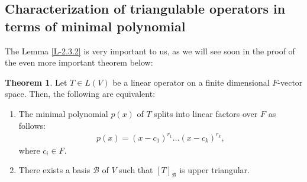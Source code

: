 \documentclass[letterpaper,11pt,twoside]{article}
\theoremstyle{definition}
\theoremstyle{definition}
\newtheorem{theorem}[proposition]{Theorem}
\theoremstyle{definition}
\theoremstyle{definition}
\theoremstyle{definition}
\theoremstyle{definition}
\theoremstyle{remark}
\theoremstyle{definition}
\begin{document}
    \subsection{Characterization of triangulable operators in terms of minimal polynomial}
    The Lemma \ref{L-2.3.2} is very important to us, as we will see soon in the proof of the even more important theorem below:
    \begin{theorem}\label{T-2.4.1}
    Let $T \in L(V)$ be a linear operator on a finite dimensional $F$-vector space. Then, the following are equivalent:
    \begin{enumerate}
        \item {The minimal polynomial $p(x)$ of $T$ splits into linear factors over $F$ as follows:
        \begin{align*}
            p(x) = (x-c_1)^{r_1} \dots (x-c_k)^{r_k},
        \end{align*}
        where $c_i\in F$.
        }
        \item {There exists a basis $\mathcal{B}$ of $V$ such that $[T]_\mathcal{B}$ is upper triangular.}
    \end{enumerate}
    \end{theorem}
\end{document}
